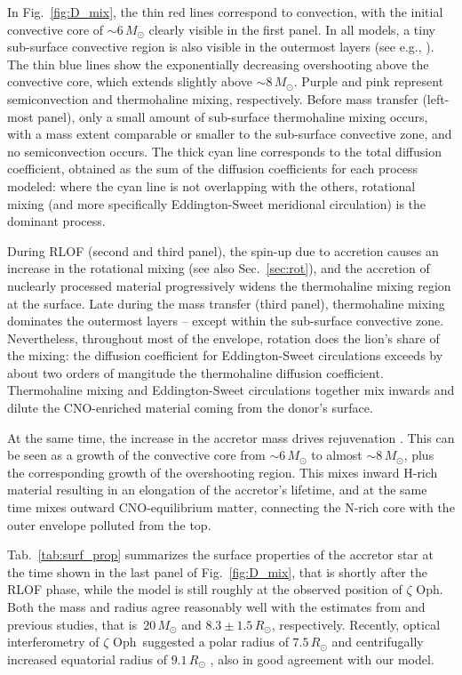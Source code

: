 \documentclass[twocolumn,twocolappendix,trackchanges]{aastex63}
\DeclareRobustCommand{\Figref}[1]{Fig.~\ref{#1}}
\DeclareRobustCommand{\Tabref}[1]{Tab.~\ref{#1}}
\DeclareRobustCommand{\Secref}[1]{Sec.~\ref{#1}}
\newcommand{\zoph}{$\zeta$ Oph}
\begin{document}
In \Figref{fig:D_mix}, the thin red lines correspond to convection,
with the initial convective core of
$\sim$$6\,M_\odot$ clearly visible in the first panel. In all models, a tiny sub-surface convective region is also visible in the outermost layers (see e.g., \citealt{cantiello:21}).  The thin blue lines show the exponentially decreasing overshooting above the convective core, which extends slightly above
$\sim$8\,$M_\odot$. Purple and pink represent semiconvection and thermohaline mixing, respectively. Before mass transfer (left-most panel), only a small amount of sub-surface thermohaline mixing occurs, with a mass extent comparable or smaller to the sub-surface convective zone, and no semiconvection occurs. The thick cyan line corresponds to the total diffusion coefficient, obtained as the sum of the diffusion coefficients for each process modeled: where the cyan line is not overlapping with the others, rotational mixing (and more specifically Eddington-Sweet meridional circulation) is the dominant process.

During RLOF (second and third panel), the spin-up due to accretion causes an increase in the rotational mixing (see also \Secref{sec:rot}), and the accretion of nuclearly processed material progressively widens the thermohaline mixing region at the surface. Late during the mass transfer (third panel), thermohaline mixing dominates the outermost layers -- except within the sub-surface convective zone. Nevertheless, throughout most of the envelope, rotation does the lion's share of the mixing: the diffusion coefficient for Eddington-Sweet circulations exceeds by about two orders of mangitude the thermohaline diffusion coefficient. Thermohaline mixing and Eddington-Sweet circulations together mix inwards and dilute the CNO-enriched material coming from the donor's surface.

At the same time, the increase in the accretor mass drives
rejuvenation \citep[e.g.,][]{schneider:16}. This can be seen as a
growth of the convective core from
$\sim$$6\,M_\odot$ to almost $\sim$$8\,M_\odot$, plus the
corresponding growth of the overshooting region. This mixes inward
H-rich material resulting in an elongation of the accretor's lifetime,
and at the same time mixes outward CNO-equilibrium matter, connecting
the N-rich core with the outer envelope polluted from the top.



\Tabref{tab:surf_prop} summarizes the surface properties of the
accretor star at the time shown in the last panel of
\Figref{fig:D_mix}, that is shortly after the RLOF phase, while the
model is still roughly at the observed position of \zoph. Both the
mass and radius agree reasonably well with the estimates from
 and previous studies, that is~$20\,M_\odot$
and $8.3\pm1.5\,R_\odot$, respectively. Recently, optical
interferometry of \zoph\ suggested a polar radius of $7.5\,R_\odot$
and centrifugally increased equatorial radius of $9.1\,R_\odot$
\citep{gordon:18}, also in good agreement with our model.
\end{document}
